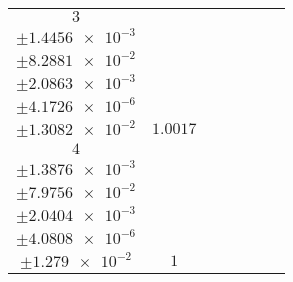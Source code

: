 \documentclass[8pt]{article}
\begin{document}
\begin{longtable}[l]{c c c c c c c}
$\num{3}$ & \begin{tabular}[c]{@{}c@{}}$\num{1.0002}$ \\ $\pm\num{1.4456e-3}$\end{tabular} & \begin{tabular}[c]{@{}c@{}}$\num{-6.5178e-3}$ \\ $\pm\num{8.2881e-2}$\end{tabular} & \begin{tabular}[c]{@{}c@{}}$\num{2.257e+3}$ \\ $\pm\num{2.0863e-3}$\end{tabular} & \begin{tabular}[c]{@{}c@{}}$\num{4.514}$ \\ $\pm\num{4.1726e-6}$\end{tabular} & \begin{tabular}[c]{@{}c@{}}$\num{7.0169}$ \\ $\pm\num{1.3082e-2}$\end{tabular} & $\num{1.0017}$\\
$\num{4}$ & \begin{tabular}[c]{@{}c@{}}$\num{0.99804}$ \\ $\pm\num{1.3876e-3}$\end{tabular} & \begin{tabular}[c]{@{}c@{}}$\num{4.9217e-2}$ \\ $\pm\num{7.9756e-2}$\end{tabular} & \begin{tabular}[c]{@{}c@{}}$\num{2.2656e+3}$ \\ $\pm\num{2.0404e-3}$\end{tabular} & \begin{tabular}[c]{@{}c@{}}$\num{4.5312}$ \\ $\pm\num{4.0808e-6}$\end{tabular} & \begin{tabular}[c]{@{}c@{}}$\num{6.9955}$ \\ $\pm\num{1.279e-2}$\end{tabular} & $\num{1}$\\
\bottomrule
\end{longtable}
\end{document}
